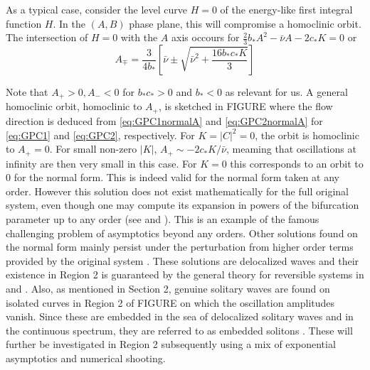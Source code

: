 As a typical case, consider  the level curve $H=0$ of the energy-like first integral function $H$. In the $(A,B)$ phase plane,
this will compromise a homoclinic orbit. The intersection of $H=0$ with the $A$ axis occours for $ \frac{2}{3} b_* A^2 - \bar{\nu}A - 2 c_* K = 0$ or
\begin{equation}
A_{\mp} = \frac{3}{4 b_*} \left[ \bar{\nu} \pm \sqrt{ \bar{\nu}^2 + \frac{16 b_* c_* K}{3} } \right]
\end{equation}

Note that $A_+ > 0, A_- < 0 $ for $b_* c_* > 0 $ and $b_* < 0$ as relevant for us. A general homoclinic orbit, homoclinic to $A_+$, is sketched
in FIGURE where the flow direction is deduced from \eqref{eq:GPC1normalA} and \eqref{eq:GPC2normalA} for \eqref{eq:GPC1} and \eqref{eq:GPC2}, respectively.
For $K=\left|C\right|^2 = 0 $, the orbit is homoclinic to $A_+=0$. For small non-zero $\left|K\right|$, $ A_+ \sim - 2 c_* K / \bar{\nu}$, meaming that
oscillations at infinity are then very small in this case. For $K=0$ this corresponds to an orbit to 0 for the normal form. This is indeed valid for
the normal form taken at any order. However this solution does not exist mathematically for the full original system, even though
one may compute its expansion in powers of the bifurcation parameter up to any order (see \cite{Lombardi1} and \cite{Lombardi2}). This is an example
of the famous challenging problem of asymptotics beyond any orders. Other solutions found on the normal form mainly persist under the perturbation from
higher order terms provided by the original system \cite{IK}. These solutions are delocalized waves and their existence in Region 2 is guaranteed
by the general theory for reversible systems in \cite{Lombardi1} and \cite{Lombardi2}. Also, as mentioned in Section 2, genuine solitary waves are found on isolated
curves in Region 2 of FIGURE on which the oscillation amplitudes vanish. Since these are embedded in the sea of delocalized solitary waves and in the 
continuous spectrum, they are referred to as embedded solitons \cite{CMYK}. These will further be investigated in Region 2 subsequently using a mix of
exponential asymptotics and numerical shooting.


